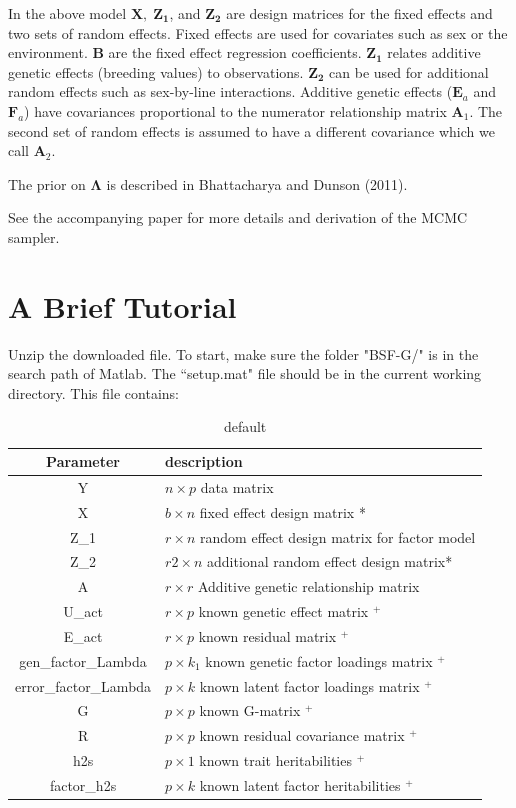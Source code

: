 \documentclass[11pt]{amsart}
\begin{document}
In the above model $\mathbf{X}, \; \mathbf{Z_1}$, and $\mathbf{Z_2}$ are design matrices for the fixed effects and two sets of random effects. Fixed effects are used for covariates such as sex or the environment. $\mathbf{B}$ are the fixed effect regression coefficients. $\mathbf{Z_1}$ relates additive genetic effects (breeding values) to observations. $\mathbf{Z_2}$ can be used for additional random effects such as sex-by-line interactions. Additive genetic effects ($\mathbf{E}_a$ and $\mathbf{F}_a$) have covariances proportional to the numerator relationship matrix $\mathbf{A}_1$. The second set of random effects is assumed to have a different covariance which we call $\mathbf{A}_2$. 

The prior on $\mathbf{\Lambda}$ is described in Bhattacharya and Dunson (2011).

See the accompanying paper for more details and derivation of the MCMC sampler.

\section{A Brief Tutorial}
Unzip the downloaded file. To start, make sure the folder "BSF-G/" is in the search path of Matlab. The ``setup.mat" file should be in the current working directory. This file contains:
\begin{table}[htdp]
\caption{default}
\begin{center}
\begin{tabular}{|c|l|}
\hline
Parameter & description \\ 
\hline
     Y & $n \times p$ data matrix \\ \hline
     X & $b \times n$ fixed effect design matrix * \\ \hline
     Z\_1 & $r \times n$ random effect design matrix for factor model \\ \hline
     Z\_2 & $r2 \times n$ additional random effect design matrix* \\ \hline
     A &  $r \times r$ Additive genetic relationship matrix \\ \hline
     U\_act & $r \times p$ known genetic effect matrix $^+$ \\ \hline
     E\_act & $r \times p$ known residual matrix $^+$ \\ \hline
     gen\_factor\_Lambda & $p \times k_1$ known genetic factor loadings matrix $^+$ \\ \hline
     error\_factor\_Lambda & $p \times k$ known latent factor loadings matrix $^+$ \\ \hline
     G & $p \times p$ known G-matrix $^+$ \\ \hline
     R & $p \times p$ known residual covariance matrix $^+$ \\ \hline
     h2s & $p \times 1$ known trait heritabilities $^+$ \\ \hline
     factor\_h2s & $p \times k$ known latent factor heritabilities $^+$ \\ \hline
\end{tabular}
\end{center}
\label{default}
\end{table}%
\end{document}
